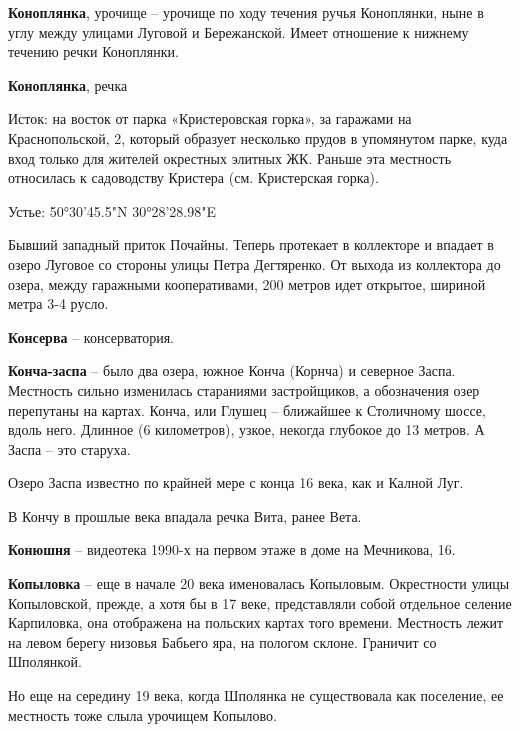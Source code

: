 \medskip

\textbf{Коноплянка}, урочище – урочище по ходу течения ручья Коноплянки, ныне в углу между улицами Луговой и Бережанской. Имеет отношение к нижнему течению речки Коноплянки.\\

\medskip

\textbf{Коноплянка}, речка

Исток: на восток от парка «Кристеровская горка», за гаражами на Краснопольской, 2, который образует несколько прудов в упомянутом парке, куда вход только для жителей окрестных элитных ЖК. Раньше эта местность относилась к садоводству Кристера (см. Кристерская горка).

Устье: 50°30'45.5"N 30°28'28.98"E

Бывший западный приток Почайны. Теперь протекает в коллекторе и впадает в озеро Луговое со стороны улицы Петра Дегтяренко. От выхода из коллектора до озера, между гаражными кооперативами, 200 метров идет открытое, шириной метра 3-4 русло.\\

\medskip

\textbf{Консерва} – консерватория.\\

\medskip

\textbf{Конча-заспа} – было два озера, южное Конча (Корнча) и северное Заспа. Местность сильно изменилась стараниями застройщиков, а обозначения озер перепутаны на картах. Конча, или Глушец – ближайшее к Столичному шоссе, вдоль него. Длинное (6 километров), узкое, некогда глубокое до 13 метров. А Заспа – это старуха.

Озеро Заспа известно по крайней мере с конца 16 века, как и Калной Луг.

В Кончу в прошлые века впадала речка Вита, ранее Вета.\\

\medskip

\textbf{Конюшня} – видеотека 1990-х на первом этаже в доме на Мечникова, 16.\\

\medskip

\textbf{Копыловка} – еще в начале 20 века именовалась Копыловым. Окрестности улицы Копыловской, прежде, а хотя бы в 17 веке, представляли собой отдельное селение Карпиловка, она отображена на польских картах того времени. Местность лежит на левом берегу низовья Бабьего яра, на пологом склоне. Граничит со Шполянкой.

Но еще на середину 19 века, когда Шполянка не существовала как поселение, ее местность тоже слыла урочищем Копылово.

